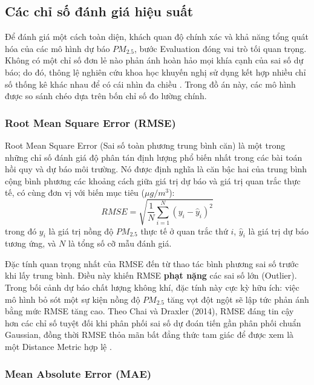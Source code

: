 \subsection{Các chỉ số đánh giá hiệu suất}

Để đánh giá một cách toàn diện, khách quan độ chính xác và khả năng tổng quát hóa của các mô hình dự báo $PM_{2.5}$, bước Evaluation đóng vai trò tối quan trọng. Không có một chỉ số đơn lẻ nào phản ánh hoàn hảo mọi khía cạnh của sai số dự báo; do đó, thông lệ nghiên cứu khoa học khuyến nghị sử dụng kết hợp nhiều chỉ số thống kê khác nhau để có cái nhìn đa chiều \cite{chai2014rmse, armstrong1992mape}. Trong đồ án này, các mô hình được so sánh chéo dựa trên bốn chỉ số đo lường chính.

\subsubsection{Root Mean Square Error (RMSE)}

Root Mean Square Error (Sai số toàn phương trung bình căn) là một trong những chỉ số đánh giá độ phân tán định lượng phổ biến nhất trong các bài toán hồi quy và dự báo môi trường. Nó được định nghĩa là căn bậc hai của trung bình cộng bình phương các khoảng cách giữa giá trị dự báo và giá trị quan trắc thực tế, có cùng đơn vị với biến mục tiêu ($\mu g/m^3$):
\begin{equation}
    RMSE = \sqrt{\frac{1}{N} \sum_{i=1}^{N} \left( y_i - \hat{y}_i \right)^2}
\end{equation}
trong đó $y_i$ là giá trị nồng độ $PM_{2.5}$ thực tế ở quan trắc thứ $i$, $\hat{y}_i$ là giá trị dự báo tương ứng, và $N$ là tổng số cỡ mẫu đánh giá.

Đặc tính quan trọng nhất của RMSE đến từ thao tác bình phương sai số trước khi lấy trung bình. Điều này khiến RMSE \textbf{phạt nặng} các sai số lớn (Outlier). Trong bối cảnh dự báo chất lượng không khí, đặc tính này cực kỳ hữu ích: việc mô hình bỏ sót một sự kiện nồng độ $PM_{2.5}$ tăng vọt đột ngột sẽ lập tức phản ánh bằng mức RMSE tăng cao. Theo Chai và Draxler (2014), RMSE đáng tin cậy hơn các chỉ số tuyệt đối khi phân phối sai số dự đoán tiến gần phân phối chuẩn Gaussian, đồng thời RMSE thỏa mãn bất đẳng thức tam giác để được xem là một Distance Metric hợp lệ \cite{chai2014rmse}.

\subsubsection{Mean Absolute Error (MAE)}

